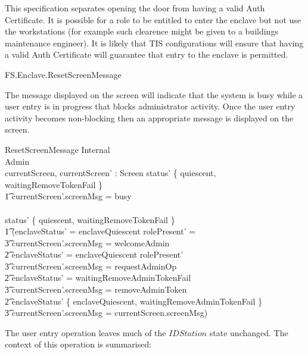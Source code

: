 This specification separates opening the door from having a valid Auth
Certificate. It is possible for a role to be entitled to enter the
enclave but not use the workstations (for example such clearence might
be given to a buildings maintenance engineer). It is likely that TIS
configurations will ensure that having a valid Auth Certificate will
guarantee that entry to the enclave is permitted. 

\begin{traceunit}{FS.Enclave.ResetScreenMessage}
\end{traceunit}
The message displayed on the screen will indicate that the
system is busy while a user entry is in progress that blocks
administrator activity. Once the user entry activity becomes
non-blocking then an appropriate message is displayed on the screen.

\begin{schema}{ResetScreenMessage}
        \Delta Internal
\\      \Delta Admin
\\      currentScreen, currentScreen' : Screen
\where
        status' \notin \{ quiescent, waitingRemoveTokenFail \} 
\\ \t1 \land currentScreen'.screenMsg = busy
\\      \lor
\\      status' \in \{ quiescent, waitingRemoveTokenFail \}
\\ \t1 \land (enclaveStatus' = enclaveQuiescent \land rolePresent' = \Nil 
\\ \t3          \land currentScreen'.screenMsg = welcomeAdmin
\\ \t2 \lor enclaveStatus' = enclaveQuiescent \land rolePresent' \neq \Nil 
\\ \t3          \land currentScreen'.screenMsg = requestAdminOp
\\ \t2 \lor enclaveStatus' = waitingRemoveAdminTokenFail 
\\ \t3          \land currentScreen'.screenMsg = removeAdminToken
\\ \t2 \lor enclaveStatus' \notin 
        \{ enclaveQuiescent, waitingRemoveAdminTokenFail \} 
\\ \t3          \land currentScreen'.screenMsg = currentScreen.screenMsg)
\end{schema}

The user entry operation leaves much of the $IDStation$ state
unchanged. The context of this operation is summarised:

